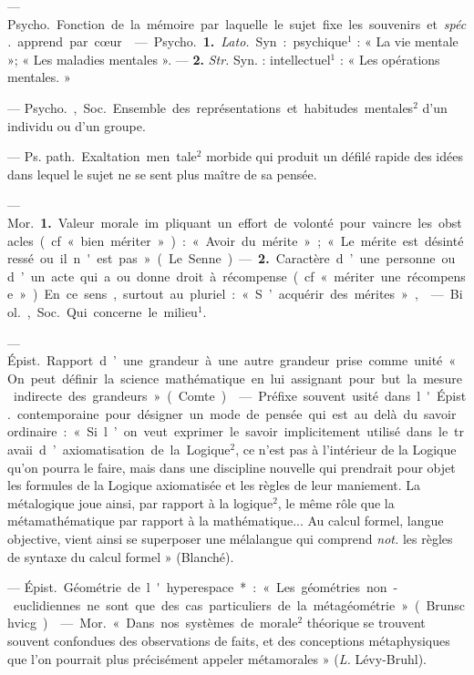 \begin{itemize}[leftmargin=1cm, label=, itemsep=1pt]
 — \si{Psycho.}
Fonction de la mémoire par laquelle
le sujet fixe les souvenirs et {\it spéc.}
apprend par cœur.

 — \si{Psycho.} {\bf 1.} {\it Lato.} Syn. :
psychique$^1$ : « La vie mentale »; « Les
maladies mentales ». — {\bf 2.} {\it Str.} Syn. :
intellectuel$^1$ : « Les opérations mentales. »

 — \si{Psycho.}, \si{Soc.} Ensemble
des représentations et habitudes mentales$^2$ d’un individu ou d’un groupe.

 — \si{Ps. path.} Exaltation men
tale$^2$ morbide qui produit un défilé
rapide des idées dans lequel le sujet
ne se sent plus maître de sa pensée.

 — \si{Mor.} {\bf 1.} Valeur morale im
pliquant un effort de volonté pour
vaincre les obstacles (cf. « bien
mériter ») : « Avoir du mérite »; « Le
mérite est désintéressé ou il n'est
pas » (Le Senne). — {\bf 2.} Caractère
d’une personne ou d’un acte qui a
ou donne droit à récompense (cf.
« mériter une récompense »). En ce
sens, surtout au pluriel : « S’acquérir
des mérites »,

 — \si{Biol.}, \si{Soc.} Qui concerne le milieu$^1$.

 — \si{Épist.} Rapport d’une
grandeur à une autre grandeur
prise comme unité « On peut
définir la science mathématique en
lui assignant pour but la mesure
indirecte des grandeurs » (Comte).

 — Préfixe souvent usité dans
l'\si{Épist.} contemporaine pour désigner un mode de pensée qui est au
delà du savoir ordinaire : « Si l’on
veut exprimer le savoir implicitement utilisé dans le travaii d’axiomatisation de la Logique$^2$, ce n’est
pas à l’intérieur de la Logique qu’on
pourra le faire, mais dans une discipline nouvelle qui prendrait pour
objet les formules de la Logique
axiomatisée et les règles de leur
maniement. La métalogique joue
ainsi, par rapport à la logique$^2$, le
même rôle que la métamathématique
par rapport à la mathématique... Au
calcul formel, langue objective, vient
ainsi se superposer une mélalangue
qui comprend {\it not.} les règles de
syntaxe du calcul formel » (Blanché).

 — \si{Épist.} Géométrie
de l'hyperespace* : « Les géométries
non-euclidiennes ne sont que des
cas particuliers de la métagéométrie » (Brunschvicg).

 — \si{Mor.} « Dans nos systèmes de morale$^2$ théorique se trouvent souvent confondues des observations de faits, et des conceptions
métaphysiques que l’on pourrait
plus précisément appeler métamorales » ({\it L.} Lévy-Bruhl).


\end{itemize}
